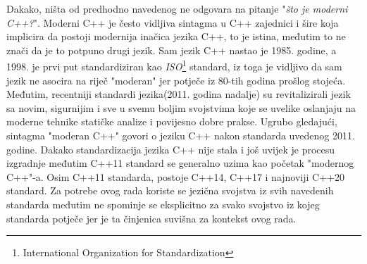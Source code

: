 Dakako, ništa od predhodno navedenog ne odgovara na pitanje "\textit{što je moderni C++?}". Moderni C++ je često vidljiva sintagma u C++ zajednici i šire koja implicira da postoji modernija inačica jezika C++, to je istina, međutim to ne znači da je to potpuno drugi jezik. Sam jezik C++ nastao je 1985. godine, a 1998. je prvi put standardiziran kao \textit{ISO}\footnote{International Organization for Standardization} standard, iz toga je vidljivo da sam jezik ne asocira na riječ "moderan" jer potječe iz 80-tih godina prošlog stojeća. Međutim, recentniji standardi jezika(2011. godina nadalje) su revitalizirali jezik sa novim, sigurnijim i sve u svemu boljim svojstvima koje se uvelike oslanjaju na moderne tehnike statičke analize i povijesno dobre prakse. Ugrubo gledajući, sintagma "moderan C++" govori o jeziku C++ nakon standarda uvedenog 2011. godine. Dakako standardizacija jezika C++ nije stala i još uvijek je procesu izgradnje međutim C++11 standard se generalno uzima kao početak "modernog C++"-a. Osim C++11 standarda, postoje C++14, C++17 i najnoviji C++20 standard. Za potrebe ovog rada koriste se jezična svojstva iz svih navedenih standarda međutim ne spominje se eksplicitno za svako svojstvo iz kojeg standarda potječe jer je ta činjenica suvišna za kontekst ovog rada.

